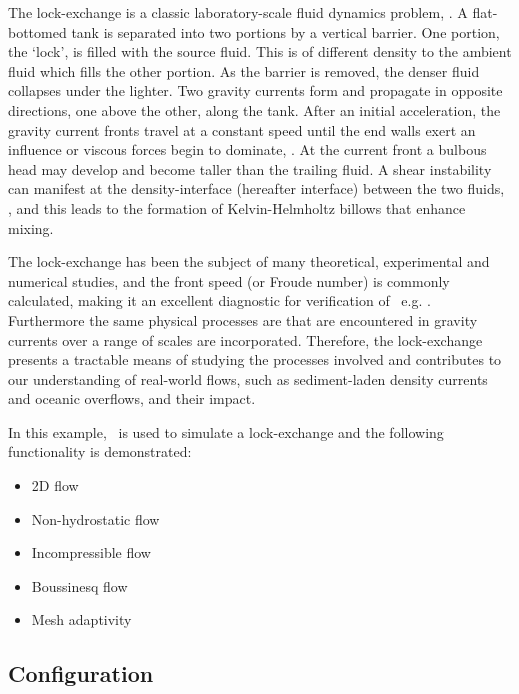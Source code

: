 The lock-exchange is a classic laboratory-scale fluid dynamics problem, \citep{fannelop_94, huppert_06, simpson_87}. A flat-bottomed tank is separated into two portions by a vertical barrier. One portion, the `lock', is filled with the source fluid. This is of different density to the ambient fluid which fills the other portion. As the barrier is removed, the denser fluid collapses under the lighter. Two gravity currents form and propagate in opposite directions, one above the other, along the tank. After an initial acceleration, the gravity current fronts travel at a constant speed until the end walls exert an influence or viscous forces begin to dominate, \citep{cantero_07, hartel_99, huppert_80}. At the current front a bulbous head may develop and become taller than the trailing fluid. A shear instability can manifest at the density-interface (hereafter interface) between the two fluids, \citep{turner_73}, and this leads to the formation of Kelvin-Helmholtz billows that enhance mixing.

The lock-exchange has been the subject of many theoretical, experimental and numerical studies, and the front speed (or Froude number) is commonly calculated, making it an excellent diagnostic for verification of \fluidity\, e.g. \citep{benjamin_68, klemp_94, hartel_00}. Furthermore the same physical processes are that are encountered in gravity currents over a range of scales are incorporated. Therefore, the lock-exchange presents a tractable means of studying the processes involved and contributes to our understanding of real-world flows, such as sediment-laden density currents and oceanic overflows, and their impact.

In this example, \fluidity\ is used to simulate a lock-exchange and the following functionality is demonstrated:

\begin{itemize}
\item 2D flow
\item Non-hydrostatic flow
\item Incompressible flow
\item Boussinesq flow
\item Mesh adaptivity

\end{itemize}

\subsection{Configuration}
\label{sect:lock_exchange_configuration}

